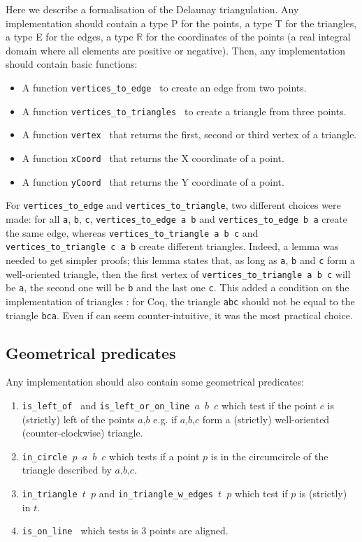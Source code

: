 \documentclass[a4paper,10pt]{article}
\def\ttt#1#2{{\tt{\color{black}#1} #2}}
\begin{document}
Here we describe a formalisation of the Delaunay triangulation. Any implementation should contain a type P for the points, a type T for the triangles, a type E for the edges, a type $\mathbb{R}$ for the coordinates of the points (a real integral domain where all elements are positive or negative).
Then, any implementation should contain basic functions:
\begin{itemize}
\item A function \ttt{vertices\_to\_edge}{} to create an edge from two points.
\item A function \ttt{vertices\_to\_triangles}{} to create a triangle from three points.
\item A function \ttt{vertex}{}  that returns the first, second or third vertex of a triangle.
\item A function \ttt{xCoord}{} that returns the X coordinate of a point.
\item A function \ttt{yCoord}{} that returns the Y coordinate of a point.
\end{itemize}

For {\tt vertices\_to\_edge} and {\tt vertices\_to\_triangle}, two different choices were made:
for all {\tt a}, {\tt b}, {\tt c}, {\tt vertices\_to\_edge a b} and {\tt vertices\_to\_edge b a} create the same edge, whereas {\tt vertices\_to\_triangle a b c} and {\tt vertices\_to\_triangle c a b} create different triangles. Indeed, a lemma was needed to get simpler proofs; this lemma states that, as long as {\tt a}, {\tt b} and {\tt c} form a well-oriented triangle, then the first vertex of {\tt vertices\_to\_triangle a b c} will be {\tt a}, the second one will be {\tt b} and the last one {\tt c}. This added a condition on the implementation of triangles : for {\sc Coq}, the triangle {\tt abc} should not be equal to the triangle {\tt bca}. Even if can seem counter-intuitive, it was the most practical choice. 


\subsection{Geometrical predicates}
\label{predicate}
Any implementation should also contain some geometrical predicates:
\begin{enumerate}
\item \ttt{is\_left\_of}{} and \ttt{is\_left\_or\_on\_line}{$a$ $b$ $c$} which test if the point $c$ is (strictly) left of the points $a$,$b$ e.g. if $a$,$b$,$c$ form a (strictly) well-oriented (counter-clockwise) triangle.
\item \ttt{in\_circle}{$p$ $a$ $b$ $c$} which tests if a point $p$ is in the circumcircle of the triangle described by $a$,$b$,$c$.
\item \ttt{in\_triangle}{$t$ $p$} and \ttt{in\_triangle\_w\_edges}{$t$ $p$} which test if $p$ is (strictly) in $t$.
  \item \ttt{is\_on\_line}{} which tests is 3 points are aligned.

\end{enumerate}
\end{document}
